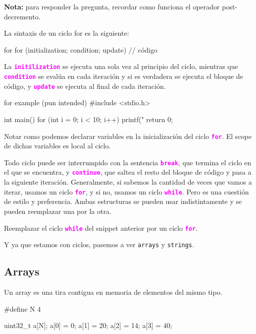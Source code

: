 \documentclass[]{scrartcl}
\newcommand{\hl}[1]{\textcolor{magenta}{\textbf{\texttt{#1}}}}
\begin{document}
\begin{notebox}
  \textbf{Nota:} para responder la pregunta, recordar como funciona el operador post-decremento.
\end{notebox}

La sintaxis de un ciclo for es la siguiente:

\begin{cbox}[]{for}
  for (initialization; condition; update) {
    // código
  }
\end{cbox}

La \hl{initilization} se ejecuta una sola vez al principio del ciclo, mientras que \hl{condition} se evalúa en cada iteración y si es verdadera se ejecuta el bloque de código, y \hl{update} se ejecuta al final de cada iteración.

\begin{cbox}[]{for example (pun intended)}
  #include <stdio.h>
  
  int main() {
    for (int i = 0; i < 10; i++) {
      printf("%
    }
    return 0;
  }
\end{cbox}

Notar como podemos declarar variables en la inicialización del ciclo \hl{for}. El scope de dichas variables es local al ciclo.

Todo ciclo puede ser interrumpido con la sentencia \hl{break}, que termina el ciclo en el que se encuentra, y \hl{continue}, que saltea el resto del bloque de código y pasa a la siguiente iteración.
Generalmente, si sabemos la cantidad de veces que vamos a iterar, usamos un ciclo \hl{for}, y si no, usamos un ciclo \hl{while}. Pero es una cuestión de estilo y preferencia. Ambas estructuras se pueden usar indistintamente y se pueden reemplazar una por la otra.

\begin{exbox}[]
  Reemplazar el ciclo \hl{while} del snippet anterior por un ciclo \hl{for}.
\end{exbox}
 
Y ya que estamos con ciclos, pasemos a ver \texttt{arrays} y \texttt{strings}.

\subsection*{Arrays}
Un array es una tira contigua en memoria de elementos del mismo tipo.

\begin{cbox}[]{}
#define N 4

uint32_t a[N];
a[0] = 0;
a[1] = 20;
a[2] = 14;
a[3] = 40;

\end{cbox}
\end{document}
